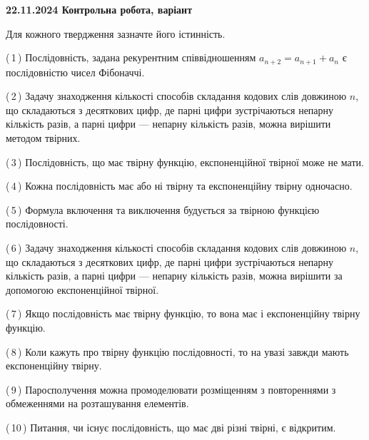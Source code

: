 \documentclass[12pt, ukrainian]{article}
\begin{document}
\begin {large}
\begin {large}
\begin {large}
\begin {large}
\begin {large}
\begin {large}
\begin {large}
\textbf{22.11.2024 Контрольна робота, варіант  }\par


{
Для кожного твердження зазначте його істинність.\par

\vspace{2mm}

(\,1\,) Послідовність, задана рекурентним співвідношенням $a_{n+2}=a_{n+1}+a_{n}$ є послідовністю чисел Фібоначчі.%



(\,2\,) Задачу знаходження кількості способів складання кодових слів довжиною $n$, що складаються з десяткових цифр, де парні цифри зустрічаються непарну кількість разів, а парні цифри — непарну кількість разів, можна вирішити методом твірних.%



(\,3\,) Послідовність, що має твірну функцію, експоненційної твірної може не мати.%



(\,4\,) Кожна послідовність має або ні твірну та експоненційну твірну одночасно.%



(\,5\,) Формула включення та виключення будується за твірною функцією послідовності.%



(\,6\,) Задачу знаходження кількості способів складання кодових слів довжиною $n$, що складаються з десяткових цифр, де парні цифри зустрічаються непарну кількість разів, а парні цифри — непарну кількість разів, можна вирішити за допомогою експоненційної твірної.%



(\,7\,) Якщо послідовність має твірну функцію, то вона має і експоненційну твірну функцію.%



(\,8\,) Коли кажуть про твірну функцію послідовності, то на увазі завжди мають експоненційну твірну.%



(\,9\,) Паросполучення можна промоделювати розміщенням з повтореннями з обмеженнями на розташування елементів.%



(\,10\,) Питання, чи існує послідовність, що має дві різні твірні, є відкритим.%




\vspace{5mm}
}
\newpage


\end{large}
\end{large}
\end{large}
\end{large}
\end{large}
\end{large}
\end{large}
\end{document}
